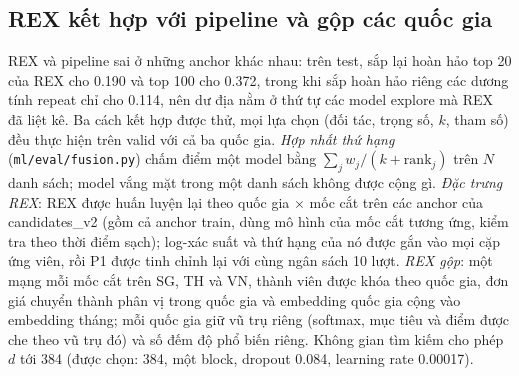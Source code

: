 \documentclass[jtehm]{ieeeaccess}
\begin{document}
\subsection{REX kết hợp với pipeline và gộp các quốc gia}
\label{sec:hybrid}
REX và pipeline sai ở những anchor khác nhau: trên test, sắp lại hoàn hảo top 20 của REX cho 0.190 và top 100 cho 0.372, trong khi
sắp hoàn hảo riêng các dương tính repeat chỉ cho 0.114, nên dư địa nằm ở thứ tự các model explore mà REX đã liệt kê. Ba cách kết hợp
được thử, mọi lựa chọn (đối tác, trọng số, $k$, tham số) đều thực hiện trên valid với cả ba quốc gia. \emph{Hợp nhất thứ hạng}
(\texttt{ml/eval/fusion.py}) chấm điểm một model bằng $\sum_j w_j / (k + \mathrm{rank}_j)$ trên $N$ danh sách; model vắng mặt trong
một danh sách không được cộng gì. \emph{Đặc trưng REX}: REX được huấn luyện lại theo quốc gia $\times$ mốc cắt trên các anchor của
candidates\_v2 (gồm cả anchor train, dùng mô hình của mốc cắt tương ứng, kiểm tra theo thời điểm sạch); log-xác suất và thứ hạng của
nó được gắn vào mọi cặp ứng viên, rồi P1 được tinh chỉnh lại với cùng ngân sách 10 lượt. \emph{REX gộp}: một mạng mỗi mốc cắt trên
SG, TH và VN, thành viên được khóa theo quốc gia, đơn giá chuyển thành phân vị trong quốc gia và embedding quốc gia cộng vào
embedding tháng; mỗi quốc gia giữ vũ trụ riêng (softmax, mục tiêu và điểm được che theo vũ trụ đó) và số đếm độ phổ biến riêng.
Không gian tìm kiếm cho phép $d$ tới 384 (được chọn: 384, một block, dropout 0.084, learning rate 0.00017).
\end{document}
